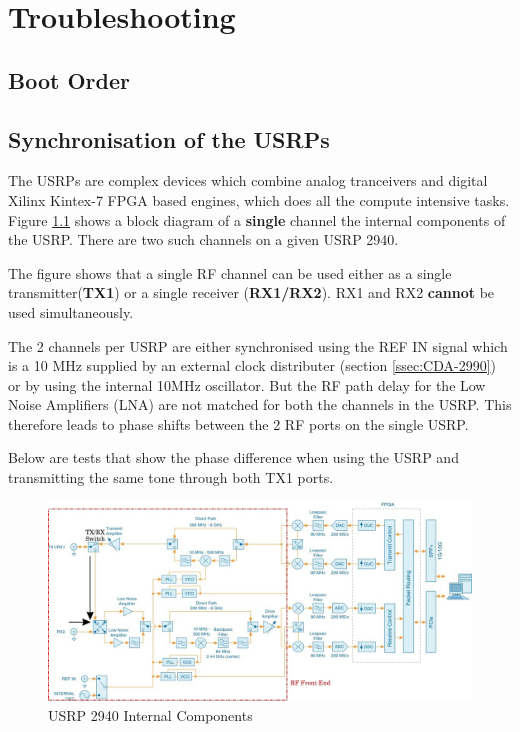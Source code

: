 \chapter{Troubleshooting}\label{ch:troubleshooting}
\section{Boot Order} \label{sec:BootOrder}
\section{Synchronisation of the USRPs} \label{sec:USRPSync}

The USRPs are complex devices which combine analog tranceivers and digital Xilinx Kintex-7 FPGA based engines, which does all the compute intensive tasks. Figure \ref{fig:USRPInternals} shows a block diagram of a \textbf{single} channel the internal components of the USRP. There are two such channels on a given USRP 2940.

The figure shows that a single RF channel can be used either as a single transmitter(\textbf{TX1}) or a single receiver (\textbf{RX1/RX2}). RX1 and RX2 \textbf{cannot} be used simultaneously.

The 2 channels per USRP are either synchronised using the REF IN signal which is a 10 MHz supplied by an external clock distributer (section \ref{ssec:CDA-2990}) or by using the internal 10MHz oscillator. But the RF path delay for the Low Noise Amplifiers (LNA) are not matched for both the channels in the USRP. This therefore leads to phase shifts between the 2 RF ports on the single USRP.

Below are tests that show the phase difference when using the USRP and transmitting the same tone through both TX1 ports.


\begin{landscape}%
    \begin{figure}[!htb]
        \centering
        \includegraphics[width=\linewidth]{images/USRPInternalsEdited.jpeg}
        \caption{USRP 2940 Internal Components}%
        \label{fig:USRPInternals}%
    \end{figure}
\end{landscape}

